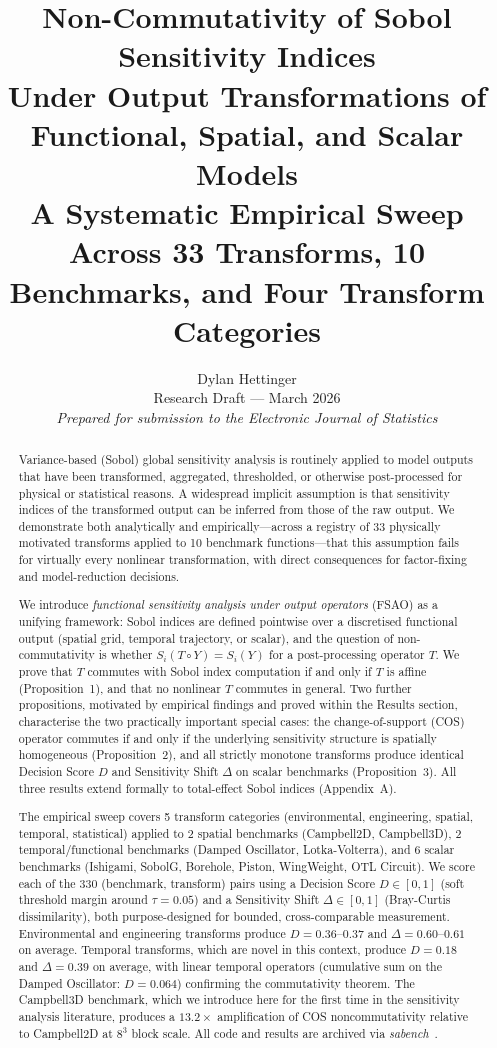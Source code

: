 \documentclass[11pt,onecolumn]{article}
\title{%
  \textbf{\color{deepblue}Non-Commutativity of Sobol Sensitivity Indices\\
  Under Output Transformations of Functional, Spatial, and Scalar Models}\\[0.4em]
  \large A Systematic Empirical Sweep Across 33 Transforms, 10 Benchmarks,
  and Four Transform Categories
}
\author{Dylan Hettinger \\ \small Research Draft --- March 2026 \\ \small \textit{Prepared for submission to the Electronic Journal of Statistics}}
\date{}
\begin{document}
\maketitle

\begin{abstract}
Variance-based (Sobol) global sensitivity analysis is routinely applied to model
outputs that have been transformed, aggregated, thresholded, or otherwise
post-processed for physical or statistical reasons.
A widespread implicit assumption is that sensitivity indices of the transformed
output can be inferred from those of the raw output.
We demonstrate both analytically and empirically---across a registry of 33
physically motivated transforms applied to 10 benchmark functions---that this
assumption fails for virtually every nonlinear transformation, with direct
consequences for factor-fixing and model-reduction decisions.

We introduce \emph{functional sensitivity analysis under output operators}
(FSAO) as a unifying framework: Sobol indices are defined pointwise over a
discretised functional output (spatial grid, temporal trajectory, or scalar),
and the question of non-commutativity is whether $S_i(T \circ Y) = S_i(Y)$
for a post-processing operator $T$.  We prove that $T$ commutes with Sobol
index computation if and only if $T$ is affine (Proposition~1), and that no
nonlinear $T$ commutes in general.  Two further propositions, motivated by
empirical findings and proved within the Results section, characterise the two
practically important special cases: the change-of-support (COS) operator
commutes if and only if the underlying sensitivity structure is spatially
homogeneous (Proposition~2), and all strictly monotone transforms produce
identical Decision Score $D$ and Sensitivity Shift $\Delta$ on scalar benchmarks
(Proposition~3).  All three results extend formally to total-effect Sobol indices
(Appendix~A).

The empirical sweep covers 5 transform categories (environmental, engineering,
spatial, temporal, statistical) applied to 2 spatial benchmarks
(Campbell2D, Campbell3D), 2 temporal/functional benchmarks
(Damped Oscillator, Lotka-Volterra), and 6 scalar benchmarks
(Ishigami, SobolG, Borehole, Piston, WingWeight, OTL Circuit).
We score each of the 330 (benchmark, transform) pairs using a Decision Score
$D \in [0,1]$ (soft threshold margin around $\tau=0.05$) and a Sensitivity
Shift $\Delta \in [0,1]$ (Bray-Curtis dissimilarity), both purpose-designed
for bounded, cross-comparable measurement.
Environmental and engineering transforms produce $D = 0.36$--$0.37$ and
$\Delta = 0.60$--$0.61$ on average.
Temporal transforms, which are novel in this context, produce
$D = 0.18$ and $\Delta = 0.39$ on average, with linear temporal operators
(cumulative sum on the Damped Oscillator: $D = 0.064$) confirming the
commutativity theorem.
The Campbell3D benchmark, which we introduce here for the first time in the
sensitivity analysis literature, produces a $13.2\times$ amplification of
COS noncommutativity relative to Campbell2D at $8^3$ block scale.
All code and results are archived via \textit{sabench}~\citep{Hettinger2025}.
\end{abstract}
\end{document}
